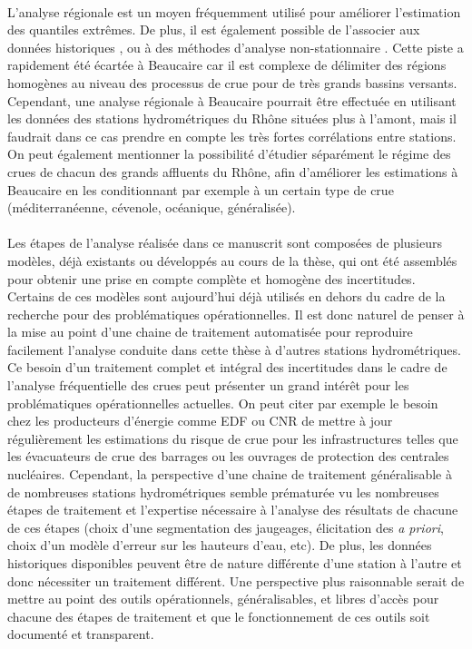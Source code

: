 		\paragraph{} L'analyse régionale est un moyen fréquemment utilisé pour améliorer l'estimation des quantiles extrêmes. De plus, il est également possible de l'associer aux données historiques \citep{gaume_bayesian_2010}, ou à des méthodes d'analyse non-stationnaire \citep{han_incorporating_2022}. Cette piste a rapidement été écartée à Beaucaire car il est complexe de délimiter des régions homogènes au niveau des processus de crue pour de très grands bassins versants. Cependant, une analyse régionale à Beaucaire pourrait être effectuée en utilisant les données des stations hydrométriques du Rhône situées plus à l'amont, mais il faudrait dans ce cas prendre en compte les très fortes corrélations entre stations. On peut également mentionner la possibilité d'étudier séparément le régime des crues de chacun des grands affluents du Rhône, afin d'améliorer les estimations à Beaucaire en les conditionnant par exemple à un certain type de crue (méditerranéenne, cévenole, océanique, généralisée).
			
		\paragraph{} Les étapes de l'analyse réalisée dans ce manuscrit sont composées de plusieurs modèles, déjà existants ou développés au cours de la thèse, qui ont été assemblés pour obtenir une prise en compte complète et homogène des incertitudes. Certains de ces modèles sont aujourd'hui déjà utilisés en dehors du cadre de la recherche pour des problématiques opérationnelles. Il est donc naturel de penser à la mise au point d'une chaine de traitement automatisée pour reproduire facilement l'analyse conduite dans cette thèse à d'autres stations hydrométriques. Ce besoin d'un traitement complet et intégral des incertitudes dans le cadre de l'analyse fréquentielle des crues peut présenter un grand intérêt pour les problématiques opérationnelles actuelles. On peut citer par exemple le besoin chez les producteurs d'énergie comme EDF ou CNR de mettre à jour régulièrement les estimations du risque de crue pour les infrastructures telles que les évacuateurs de crue des barrages ou les ouvrages de protection des centrales nucléaires. Cependant, la perspective d'une chaine de traitement généralisable à de nombreuses stations hydrométriques semble prématurée vu les nombreuses étapes de traitement et l'expertise nécessaire à l'analyse des résultats de chacune de ces étapes (choix d'une segmentation des jaugeages, élicitation des \textit{a priori}, choix d'un modèle d'erreur sur les hauteurs d'eau, etc). De plus, les données historiques disponibles peuvent être de nature différente d'une station à l'autre et donc nécessiter un traitement différent. Une perspective plus raisonnable serait de mettre au point des outils opérationnels, généralisables, et libres d'accès pour chacune des étapes de traitement et que le fonctionnement de ces outils soit documenté et transparent. 
	
